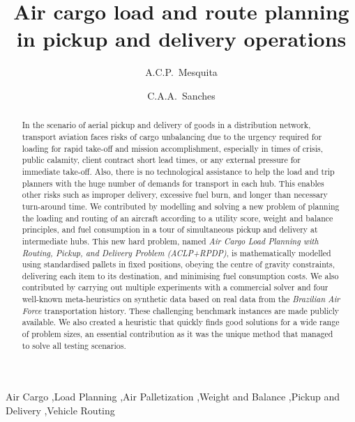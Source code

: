 \documentclass[preprint,authoryear]{elsarticle}
\begin{document}
\begin{frontmatter}

\title{Air cargo load and route planning in pickup and delivery operations}

\author{A.C.P.~Mesquita}

\author{C.A.A.~Sanches}

\address {Instituto Tecnol\'{o}gico de Aeron\'{a}utica - DCTA/ITA/IEC\\
Pra\c{c}a Mal. Eduardo Gomes, 50\\
S\~{a}o Jos\'{e} dos Campos - SP - 12.228-900 - Brazil}


\begin{abstract}

In the scenario of aerial pickup and delivery of goods in a distribution network, transport aviation faces risks of cargo unbalancing due to the urgency required for loading for rapid take-off and mission accomplishment, especially in times of crisis, public calamity, client contract short lead times, or any external pressure for immediate take-off. Also, there is no technological assistance to help the load and trip planners with the huge number of demands for transport in each hub. This enables other risks such as improper delivery, excessive fuel burn, and longer than necessary turn-around time. We contributed by modelling and solving a new problem of planning the loading and routing of an aircraft according to a utility score, weight and balance principles, and fuel consumption in a tour of simultaneous pickup and delivery at intermediate hubs. This new hard problem, named {\it Air Cargo Load Planning with Routing, Pickup, and Delivery Problem (ACLP+RPDP)}, is mathematically modelled using standardised pallets in fixed positions, obeying the centre of gravity constraints, delivering each item to its destination, and minimising fuel consumption costs. We also contributed by carrying out multiple experiments with a commercial solver and four well-known meta-heuristics on synthetic data based on real data from the {\it Brazilian Air Force}\/ transportation history. These challenging benchmark instances are made publicly available. We also created a heuristic that quickly finds good solutions for a wide range of problem sizes, an essential contribution as it was the unique method that managed to solve all testing scenarios.


\end{abstract}

\begin{keyword}
Air Cargo \sep Load Planning \sep Air Palletization \sep Weight and Balance \sep Pickup and Delivery \sep Vehicle Routing
\end{keyword}

\end{frontmatter}
\end{document}
